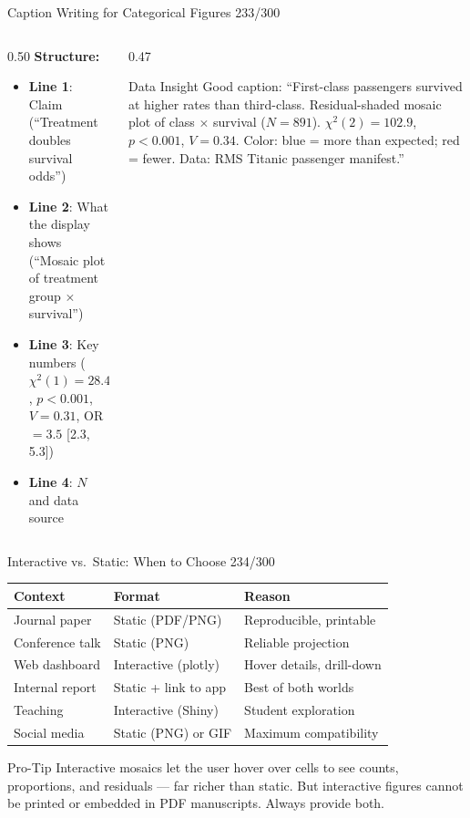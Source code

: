 \documentclass[10pt]{beamer}
\newcommand{\smark}[1]{\hfill{\scriptsize\color{codegray}#1}}
\begin{document}
\begin{frame}{Caption Writing for Categorical Figures}
\smark{233/300}
\begin{columns}[T]
\begin{column}{0.50\textwidth}
    \textbf{Structure:}
    \begin{itemize}
        \item \textbf{Line 1}: Claim (``Treatment doubles survival odds'')
        \item \textbf{Line 2}: What the display shows (``Mosaic plot of treatment group $\times$ survival'')
        \item \textbf{Line 3}: Key numbers ($\chi^2(1) = 28.4$, $p < 0.001$, $V = 0.31$, OR $= 3.5$ [2.3, 5.3])
        \item \textbf{Line 4}: $N$ and data source
    \end{itemize}
\end{column}
\begin{column}{0.47\textwidth}
\begin{exampleblock}{Data Insight}
    \scriptsize Good caption: ``First-class passengers survived at higher rates than third-class. Residual-shaded mosaic plot of class $\times$ survival ($N = 891$). $\chi^2(2) = 102.9$, $p < 0.001$, $V = 0.34$. Color: blue = more than expected; red = fewer. Data: RMS Titanic passenger manifest.''
\end{exampleblock}
\end{column}
\end{columns}
\end{frame}

\begin{frame}{Interactive vs.\ Static: When to Choose}
\smark{234/300}
\centering\small
\begin{tabular}{@{}lll@{}}
    \toprule
    \textbf{Context} & \textbf{Format} & \textbf{Reason} \\
    \midrule
    Journal paper       & Static (PDF/PNG)     & Reproducible, printable \\
    Conference talk     & Static (PNG)          & Reliable projection \\
    Web dashboard       & Interactive (plotly)  & Hover details, drill-down \\
    Internal report     & Static + link to app  & Best of both worlds \\
    Teaching            & Interactive (Shiny)   & Student exploration \\
    Social media        & Static (PNG) or GIF   & Maximum compatibility \\
    \bottomrule
\end{tabular}

\vspace{0.3cm}
\begin{alertblock}{Pro-Tip}
    \scriptsize Interactive mosaics let the user hover over cells to see counts, proportions, and residuals --- far richer than static. But interactive figures cannot be printed or embedded in PDF manuscripts. Always provide both.
\end{alertblock}
\end{frame}
\end{document}
